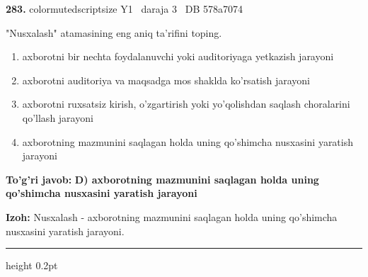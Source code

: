 \documentclass[10pt,a4paper,oneside]{article}
\begin{document}
\noindent\textbf{\color{ink}283.}  {color{muted}scriptsize Y1 \textbullet\ daraja 3 \textbullet\ DB 578a7074}
\par
"Nusxalash" atamasining eng aniq ta'rifini toping.
\begin{enumerate}[label=\Alph*),leftmargin=9mm]
\item axborotni bir nechta foydalanuvchi yoki auditoriyaga yetkazish jarayoni
\item axborotni auditoriya va maqsadga mos shaklda ko'rsatish jarayoni
\item axborotni ruxsatsiz kirish, o'zgartirish yoki yo'qolishdan saqlash choralarini qo'llash jarayoni
\item axborotning mazmunini saqlagan holda uning qo'shimcha nusxasini yaratish jarayoni
\end{enumerate}
\begin{tcolorbox}[enhanced,breakable,colback=teal!4,colframe=teal!50!black,boxrule=0.5pt,arc=1.1mm,left=3mm,right=3mm,top=1.7mm,bottom=1.7mm,before skip=2mm,after skip=2mm]
\textbf{\color{teal}To'g'ri javob:} \textbf{D) axborotning mazmunini saqlagan holda uning qo'shimcha nusxasini yaratish jarayoni}
\par\smallskip
\textbf{Izoh:} Nusxalash - axborotning mazmunini saqlagan holda uning qo'shimcha nusxasini yaratish jarayoni.
\end{tcolorbox}
\vspace{2mm}\hrule height 0.2pt \vspace{3mm}
\end{document}
